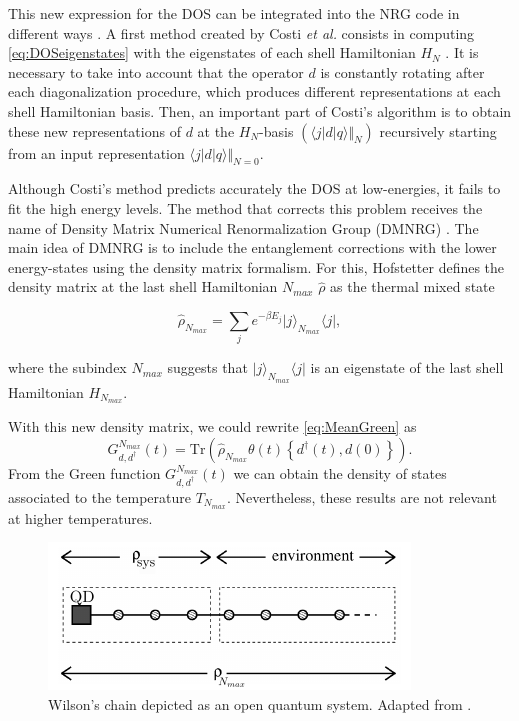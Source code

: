 \noindent This new expression for the DOS can be integrated into  the NRG code in different ways . A first method created by Costi \textit{et al.} consists in computing \eqref{eq:DOSeigenstates} with the eigenstates of each shell Hamiltonian $H_N$  \cite{costi_transport_1994}. It is necessary to take into account that the operator $ d$ is constantly rotating after each diagonalization procedure, which produces different representations at each shell Hamiltonian basis. Then, an important part of Costi's algorithm is to obtain these new representations of $d$ at the $H_N$-basis $(\langle j\vert d\vert q\rangle\Vert_N)$ recursively starting from an input representation $\langle j\vert d\vert q\rangle\Vert_{N=0}$.

Although Costi's method predicts accurately the DOS at low-energies, it fails to fit the high energy levels. The method that corrects this problem receives the name of Density Matrix Numerical Renormalization Group (DMNRG) \cite{hofstetter_generalized_2000}. The main idea of DMNRG is to include the entanglement corrections with the lower energy-states using the density matrix formalism. For this, Hofstetter defines the density matrix at the last shell Hamiltonian $N_{max}$ $\hat{\rho}$ as the thermal mixed state 

\begin{equation}
\hat{\rho}_{N_{max}} = \sum_{j}e^{-\beta E_{j}}\vert j          \rangle_{N_{max}} \langle j\vert, \label{eq:rho_n}
\end{equation}

\noindent where the subindex $N_{max}$ suggests that $\vert j \rangle_{N_{max}} \langle j\vert$ is an eigenstate of the last shell Hamiltonian $H_{N_{max}}$. 

With this new density matrix, we could rewrite \eqref{eq:MeanGreen} as 
\begin{equation}
G_{d,d^{\dagger}}^{N_{max}}(t) = \text{Tr} \left( \hat{\rho}_{N_{max}}\theta(t)\left\{ d^{\dagger}(t),d(0)\right\} \right). 
\end{equation}
\noindent From the Green function $G_{d,d^{\dagger}}^{N_{max}}(t)$ we can obtain the density of states associated to the temperature $T_{N_{max}}$. Nevertheless, these results are not relevant at higher temperatures. 

\begin{figure}
\centering
\includegraphics[scale=1]{IMAGES/DQD/DMRGchain.png}
\caption{\label{fig:OpenQuantum} Wilson's chain depicted as an open quantum system. Adapted from \cite{hofstetter_generalized_2000}.  }
\end{figure}


